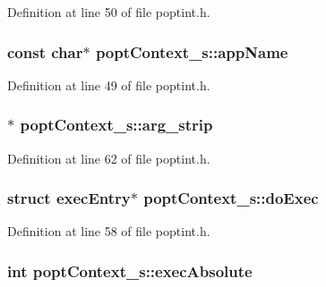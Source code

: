 Definition at line 50 of file poptint.\+h.

\hypertarget{structpopt_context__s_aafe275efe496fa1217d5d8dff6434aa9}{}
\subsubsection[{app\+Name}]{\setlength{\rightskip}{0pt plus 5cm}const char$\ast$ popt\+Context\+\_\+s\+::app\+Name}\label{structpopt_context__s_aafe275efe496fa1217d5d8dff6434aa9}


Definition at line 49 of file poptint.\+h.

\hypertarget{structpopt_context__s_a6b8f9e4e2175d16b8903243819318418}{}
\subsubsection[{arg\+\_\+strip}]{$\ast$ popt\+Context\+\_\+s\+::arg\+\_\+strip}\label{structpopt_context__s_a6b8f9e4e2175d16b8903243819318418}


Definition at line 62 of file poptint.\+h.

\hypertarget{structpopt_context__s_afc6a93680f0dff3908dd30406b271861}{}
\subsubsection[{do\+Exec}]{\setlength{\rightskip}{0pt plus 5cm}struct {\bf exec\+Entry}$\ast$ popt\+Context\+\_\+s\+::do\+Exec}\label{structpopt_context__s_afc6a93680f0dff3908dd30406b271861}


Definition at line 58 of file poptint.\+h.

\hypertarget{structpopt_context__s_a1c86e964008dc6a755671b412ac6f036}{}
\subsubsection[{exec\+Absolute}]{\setlength{\rightskip}{0pt plus 5cm}int popt\+Context\+\_\+s\+::exec\+Absolute}\label{structpopt_context__s_a1c86e964008dc6a755671b412ac6f036}


